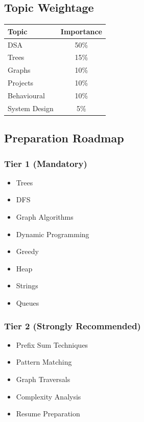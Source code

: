 \documentclass[11pt,a4paper]{article}
\begin{document}

\subsection{Topic Weightage}

\begin{center}
	\begin{tabular}{|l|c|}
		\hline
		Topic & Importance \\
		\hline
		DSA & 50\% \\
		Trees & 15\% \\
		Graphs & 10\% \\
		Projects & 10\% \\
		Behavioural & 10\% \\
		System Design & 5\% \\
		\hline
	\end{tabular}
\end{center}


\subsection{Preparation Roadmap}

\subsubsection{Tier 1 (Mandatory)}

\begin{itemize}
	\item Trees
	\item DFS
	\item Graph Algorithms
	\item Dynamic Programming
	\item Greedy
	\item Heap
	\item Strings
	\item Queues
\end{itemize}

\subsubsection{Tier 2 (Strongly Recommended)}

\begin{itemize}
	\item Prefix Sum Techniques
	\item Pattern Matching
	\item Graph Traversals
	\item Complexity Analysis
	\item Resume Preparation
\end{itemize}
\end{document}

